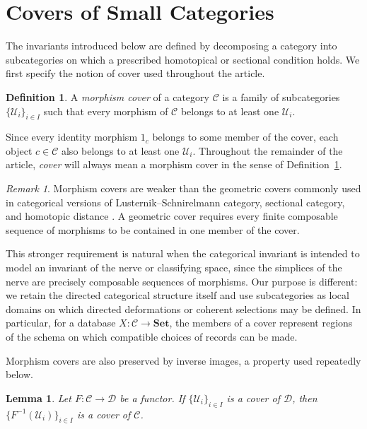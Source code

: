 \documentclass[12pt]{amsart}
\newtheorem{lemma}[teo]{Lemma}
\theoremstyle{definition}
\newtheorem{definition}[teo]{Definition}
\theoremstyle{remark}
\newtheorem{remark}{Remark}
\numberwithin{figure}{section}%
\newcommand{\CC}{\mathcal{C}}
\newcommand{\Dc}{\mathcal{D}}
\newcommand{\Sets}{\mathbf{Set}}
\newcommand{\Uc}{\mathcal{U}}
\begin{document}
\section{Covers of Small Categories}
\label{sec:categorical_covers}

The invariants introduced below are defined by decomposing a category into
subcategories on which a prescribed homotopical or sectional condition
holds. We first specify the notion of cover used throughout the article.

\begin{definition}\label{def:categorical_cover}
A \emph{morphism cover} of a category \(\CC\) is a family of subcategories
\(\{\Uc_i\}_{i\in I}\) such that every morphism of \(\CC\) belongs to at
least one \(\Uc_i\).
\end{definition}

Since every identity morphism \(1_c\) belongs to some member of the cover,
each object \(c\in\CC\) also belongs to at least one \(\Uc_i\). Throughout
the remainder of the article, \emph{cover} will always mean a morphism
cover in the sense of Definition~\ref{def:categorical_cover}.

\begin{remark}\label{rem:morphism_vs_geometric_cover}
Morphism covers are weaker than the geometric covers commonly used in
categorical versions of Lusternik--Schnirelmann category, sectional
category, and homotopic distance
\cite{LS-Tanaka,Homotopic_Distance,Baues-Isaac,
carcaciacampos2026weakstrongfibrationsfunctors}.
A geometric cover requires every finite composable sequence of morphisms
to be contained in one member of the cover.

This stronger requirement is natural when the categorical invariant is
intended to model an invariant of the nerve or classifying space, since
the simplices of the nerve are precisely composable sequences of
morphisms. Our purpose is different: we retain the directed categorical
structure itself and use subcategories as local domains on which directed
deformations or coherent selections may be defined. In particular, for a
database \(X\colon\CC\to\Sets\), the members of a cover represent regions
of the schema on which compatible choices of records can be made.

Morphism covers are also preserved by inverse images, a property used
repeatedly below.
\end{remark}

\begin{lemma}\label{lem:inverse_image_cover}
Let \(F\colon\CC\to\Dc\) be a functor. If
\(\{\Uc_i\}_{i\in I}\) is a cover of \(\Dc\), then
\(\{F^{-1}(\Uc_i)\}_{i\in I}\) is a cover of \(\CC\).
\end{lemma}
\end{document}
